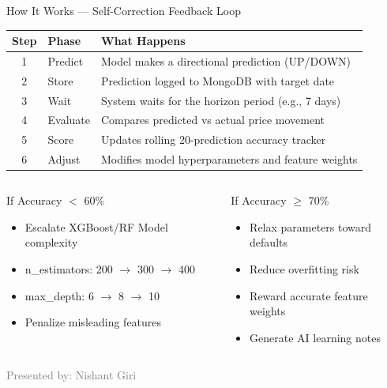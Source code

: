 \documentclass[aspectratio=169, 11pt]{beamer}
\begin{document}
\begin{frame}{How It Works --- Self-Correction Feedback Loop}

\begin{center}
\small
\renewcommand{\arraystretch}{1.15}
\begin{tabular}{c l l}
\toprule
\textbf{Step} & \textbf{Phase} & \textbf{What Happens} \\
\midrule
1 & Predict & Model makes a directional prediction (UP/DOWN) \\
2 & Store & Prediction logged to MongoDB with target date \\
3 & Wait & System waits for the horizon period (e.g., 7 days) \\
4 & Evaluate & Compares predicted vs actual price movement \\
5 & Score & Updates rolling 20-prediction accuracy tracker \\
6 & Adjust & Modifies model hyperparameters and feature weights \\
\bottomrule
\end{tabular}
\end{center}

\vspace{0.3cm}
\begin{columns}[T]
\begin{alertblock}{If Accuracy $<$ 60\%}
\begin{itemize}
    \item Escalate XGBoost/RF Model complexity
    \item n\_estimators: 200 $\rightarrow$ 300 $\rightarrow$ 400
    \item max\_depth: 6 $\rightarrow$ 8 $\rightarrow$ 10
    \item Penalize misleading features
\end{itemize}
\end{alertblock}

\begin{exampleblock}{If Accuracy $\geq$ 70\%}
\begin{itemize}
    \item Relax parameters toward defaults
    \item Reduce overfitting risk
    \item Reward accurate feature weights
    \item Generate AI learning notes
\end{itemize}
\end{exampleblock}
\end{columns}
\vfill
{\tiny\textcolor{gray}{Presented by: Nishant Giri}}
\end{frame}
\end{document}
